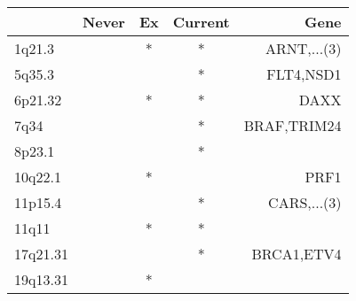 \begin{tabular}{lcccr}
\toprule
{} & Never & Ex & Current &         Gene \\
\midrule
1q21.3   &       &  * &       * &  ARNT,...(3) \\
5q35.3   &       &    &       * &    FLT4,NSD1 \\
6p21.32  &       &  * &       * &         DAXX \\
7q34     &       &    &       * &  BRAF,TRIM24 \\
8p23.1   &       &    &       * &              \\
10q22.1  &       &  * &         &         PRF1 \\
11p15.4  &       &    &       * &  CARS,...(3) \\
11q11    &       &  * &       * &              \\
17q21.31 &       &    &       * &   BRCA1,ETV4 \\
19q13.31 &       &  * &         &              \\
\bottomrule
\end{tabular}
